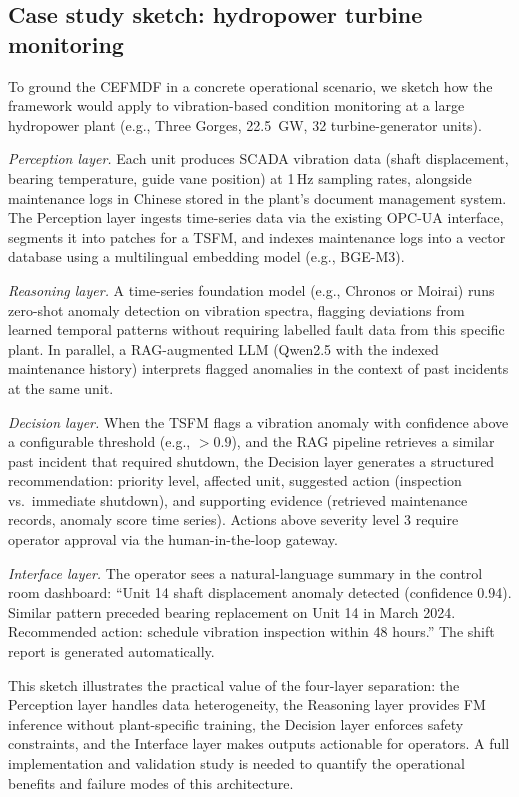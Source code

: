 \documentclass[preprint,12pt]{elsarticle}
\begin{document}
\subsection{Case study sketch: hydropower turbine monitoring}
\label{subsec:cefmdf_case_study}

To ground the CEFMDF in a concrete operational scenario, we sketch how the framework would apply to vibration-based condition monitoring at a large hydropower plant (e.g., Three Gorges, 22.5~GW, 32 turbine-generator units).

\textit{Perception layer.} Each unit produces SCADA vibration data (shaft displacement, bearing temperature, guide vane position) at 1\,Hz sampling rates, alongside maintenance logs in Chinese stored in the plant's document management system. The Perception layer ingests time-series data via the existing OPC-UA interface, segments it into patches for a TSFM, and indexes maintenance logs into a vector database using a multilingual embedding model (e.g., BGE-M3).

\textit{Reasoning layer.} A time-series foundation model (e.g., Chronos or Moirai) runs zero-shot anomaly detection on vibration spectra, flagging deviations from learned temporal patterns without requiring labelled fault data from this specific plant. In parallel, a RAG-augmented LLM (Qwen2.5 with the indexed maintenance history) interprets flagged anomalies in the context of past incidents at the same unit.

\textit{Decision layer.} When the TSFM flags a vibration anomaly with confidence above a configurable threshold (e.g., $>0.9$), and the RAG pipeline retrieves a similar past incident that required shutdown, the Decision layer generates a structured recommendation: priority level, affected unit, suggested action (inspection vs.\ immediate shutdown), and supporting evidence (retrieved maintenance records, anomaly score time series). Actions above severity level 3 require operator approval via the human-in-the-loop gateway.

\textit{Interface layer.} The operator sees a natural-language summary in the control room dashboard: ``Unit 14 shaft displacement anomaly detected (confidence 0.94). Similar pattern preceded bearing replacement on Unit 14 in March 2024. Recommended action: schedule vibration inspection within 48 hours.'' The shift report is generated automatically.

This sketch illustrates the practical value of the four-layer separation: the Perception layer handles data heterogeneity, the Reasoning layer provides FM inference without plant-specific training, the Decision layer enforces safety constraints, and the Interface layer makes outputs actionable for operators. A full implementation and validation study is needed to quantify the operational benefits and failure modes of this architecture.
\end{document}

